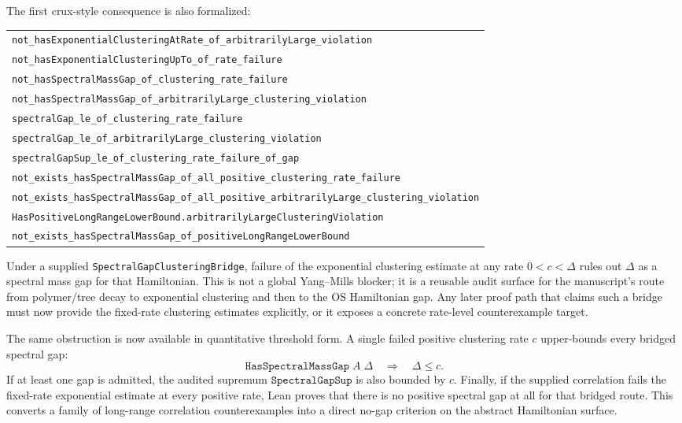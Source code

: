 \documentclass[11pt]{article}
\newcommand{\lean}[1]{\texttt{#1}}
\newcommand{\leansmall}[1]{{\small\texttt{#1}}}
\begin{document}
The first crux-style consequence is also formalized:
\begin{center}
\begin{tabular}{l}
\leansmall{not\_hasExponentialClusteringAtRate\_of\_arbitrarilyLarge\_violation}\\
\leansmall{not\_hasExponentialClusteringUpTo\_of\_rate\_failure}\\
\leansmall{not\_hasSpectralMassGap\_of\_clustering\_rate\_failure}\\
\leansmall{not\_hasSpectralMassGap\_of\_arbitrarilyLarge\_clustering\_violation}\\
\leansmall{spectralGap\_le\_of\_clustering\_rate\_failure}\\
\leansmall{spectralGap\_le\_of\_arbitrarilyLarge\_clustering\_violation}\\
\leansmall{spectralGapSup\_le\_of\_clustering\_rate\_failure\_of\_gap}\\
\leansmall{not\_exists\_hasSpectralMassGap\_of\_all\_positive\_clustering\_rate\_failure}\\
\leansmall{not\_exists\_hasSpectralMassGap\_of\_all\_positive\_arbitrarilyLarge\_clustering\_violation}\\
\leansmall{HasPositiveLongRangeLowerBound.arbitrarilyLargeClusteringViolation}\\
\leansmall{not\_exists\_hasSpectralMassGap\_of\_positiveLongRangeLowerBound}
\end{tabular}
\end{center}
Under a supplied \lean{SpectralGapClusteringBridge}, failure of the exponential
clustering estimate at any rate \(0<c<\Delta\) rules out \(\Delta\) as a
spectral mass gap for that Hamiltonian.  This is not a global Yang--Mills
blocker; it is a reusable audit surface for the manuscript's route from
polymer/tree decay to exponential clustering and then to the OS Hamiltonian
gap.  Any later proof path that claims such a bridge must now provide the
fixed-rate clustering estimates explicitly, or it exposes a concrete rate-level
counterexample target.

The same obstruction is now available in quantitative threshold form.  A
single failed positive clustering rate \(c\) upper-bounds every bridged
spectral gap:
\[
  \lean{HasSpectralMassGap}\;A\;\Delta
  \quad\Longrightarrow\quad \Delta\le c.
\]
If at least one gap is admitted, the audited supremum \(\lean{SpectralGapSup}\)
is also bounded by \(c\).  Finally, if the supplied correlation fails the
fixed-rate exponential estimate at every positive rate, Lean proves that there
is no positive spectral gap at all for that bridged route.  This converts a
family of long-range correlation counterexamples into a direct no-gap
criterion on the abstract Hamiltonian surface.
\end{document}
